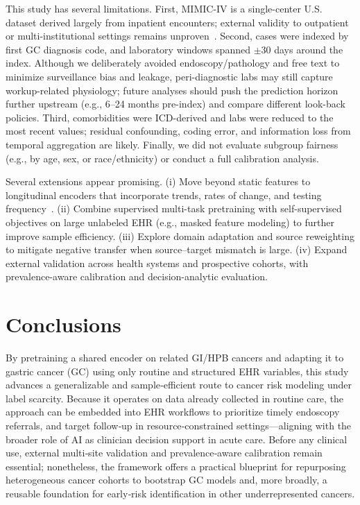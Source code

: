 \documentclass[diagnostics,article,submit,pdftex,moreauthors]{Definitions/mdpi}
\begin{document}
This study has several limitations.
First, MIMIC-IV is a single-center U.S. dataset derived largely from inpatient encounters; external validity to outpatient or multi-institutional settings remains unproven~\citep{Johnson2024MIMICIV}. Second, cases were indexed by first GC diagnosis code, and laboratory windows spanned $\pm 30$ days around the index. Although we deliberately avoided endoscopy/pathology and free text to minimize surveillance bias and leakage, peri-diagnostic labs may still capture workup-related physiology; future analyses should push the prediction horizon further upstream (e.g., 6–24 months pre-index) and compare different look-back policies. Third, comorbidities were ICD-derived and labs were reduced to the most recent values; residual confounding, coding error, and information loss from temporal aggregation are likely. 
Finally, we did not evaluate subgroup fairness (e.g., by age, sex, or race/ethnicity) or conduct a full calibration analysis.

Several extensions appear promising.
(i) Move beyond static features to longitudinal encoders that incorporate trends, rates of change, and testing frequency~\citep{DeepEHR}.
(ii) Combine supervised multi-task pretraining with self-supervised objectives on large unlabeled EHR (e.g., masked feature modeling) to further improve sample efficiency. 
(iii) Explore domain adaptation and source reweighting to mitigate negative transfer when source–target mismatch is large.
(iv) Expand external validation across health systems and prospective cohorts, with prevalence-aware calibration and decision-analytic evaluation.

\section{Conclusions}
By pretraining a shared encoder on related GI/HPB cancers and adapting it to gastric cancer (GC) using only routine and structured EHR variables,
this study advances a generalizable and sample‑efficient route to cancer risk modeling under label scarcity.
Because it operates on data already collected in routine care, the approach can be embedded into EHR workflows to prioritize timely endoscopy referrals, and target follow‑up in resource‑constrained settings—aligning with the broader role of AI as clinician decision support in acute care. 
Before any clinical use, external multi‑site validation and prevalence‑aware calibration remain essential; nonetheless, the framework offers a practical blueprint for repurposing heterogeneous cancer cohorts to bootstrap GC models and, more broadly, a reusable foundation for early‑risk identification in other underrepresented cancers.
\end{document}
